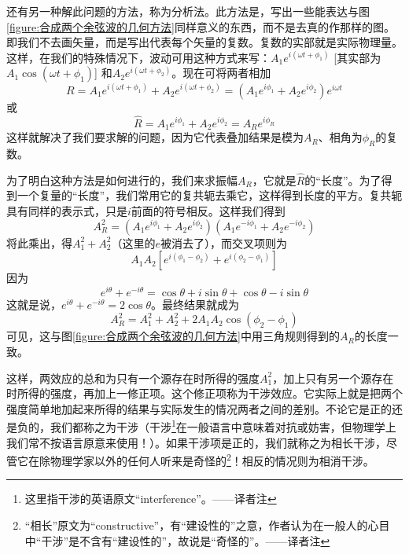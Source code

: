 还有另一种解此问题的方法，称为分析法。此方法是，写出一些能表达与图\ref{figure:合成两个余弦波的几何方法}同样意义的东西，而不是去真的作那样的图。即我们不去画矢量，而是写出代表每个矢量的复数。复数的实部就是实际物理量。这样，在我们的特殊情况下，波动可用这种方式来写：$A_1e^{i(\omega t + \phi_1)}$ [其实部为$A_1\cos(\omega t+\phi_1)$] 和$A_2e^{i(\omega t +\phi_2)}$。现在可将两者相加
\begin{equation}
    \label{Eq:I:29:13}
    R=A_1e^{i(\omega t + \phi_1)} + A_2e^{i(\omega t + \phi_2)} = (A_1e^{i\phi_1} + A_2e^{i\phi_2})e^{i\omega t}
\end{equation}
或
\begin{equation}
    \label{Eq:I:29:14}
    \hat{R} = A_1e^{i\phi_1} + A_2e^{i\phi_2} = A_Re^{i\phi_R}
\end{equation}
这样就解决了我们要求解的问题，因为它代表叠加结果是模为$A_R$、相角为$\phi_R$的复数。

为了明白这种方法是如何进行的，我们来求振幅$A_R$，它就是$\hat{R}$的“长度”。为了得到一个复量的“长度”，我们常用它的复共轭去乘它，这样得到长度的平方。复共轭具有同样的表示式，只是$i$前面的符号相反。这样我们得到
\begin{equation}
    \label{Eq:I:29:15}
    A_R^2 = (A_1e^{i\phi_1} + A_2e^{i\phi_2})(A_1e^{-i\phi_1} + A_2e^{-i\phi_2})
\end{equation}
将此乘出，得$A_1^2 + A_2^2$（这里的$e$被消去了），而交叉项则为
\begin{equation*}
    A_1A_2[e^{i(\phi_1-\phi_2)}+e^{i(\phi_2-\phi_1)}]
\end{equation*}
因为
\begin{equation*}
    e^{i\theta} + e^{-i\theta} = \cos\theta + i\sin\theta + \cos\theta - i\sin\theta
\end{equation*}
这就是说，$e^{i\theta}+e^{-i\theta}=2\cos\theta$。最终结果就成为
\begin{equation}
    \label{Eq:I:29:16}
    A_R^2=A_1^2+A_2^2 + 2A_1A_2\cos(\phi_2 - \phi_1)
\end{equation}
可见，这与图\ref{figure:合成两个余弦波的几何方法}中用三角规则得到的$A_R$的长度一致。

这样，两效应的总和为只有一个源存在时所得的强度$A_1^2$，加上只有另一个源存在时所得的强度，再加上一修正项。这个修正项称为干涉效应。它实际上就是把两个强度简单地加起来所得的结果与实际发生的情况两者之间的差别。不论它是正的还是负的，我们都称之为干涉（干涉\footnote{这里指干涉的英语原文“interference”。——译者注}在一般语言中意味着对抗或妨害，但物理学上我们常不按语言原意来使用！）。如果干涉项是正的，我们就称之为相长干涉，尽管它在除物理学家以外的任何人听来是奇怪的\footnote{“相长”原文为“constructive”，有“建设性的”之意，作者认为在一般人的心目中“干涉”是不含有“建设性的”，故说是“奇怪的”。——译者注}！相反的情况则为相消干涉。

